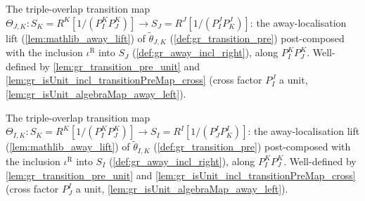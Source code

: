 \begin{definition}

  \label{def:gr_cocycle_theta_jk}
  The triple-overlap transition map
  \(\Theta_{J,K} : S_K = R^K[1/(P^K_I P^K_J)] \to S_J = R^J[1/(P^J_I P^J_K)]\):
  the away-localisation lift (\cref{lem:mathlib_away_lift}) of
  \(\tilde\theta_{J,K}\) (\cref{def:gr_transition_pre}) post-composed with the
  inclusion \(\iota^{\mathrm{R}}\) into \(S_J\) (\cref{def:gr_away_incl_right}),
  along \(P^K_I P^K_J\). Well-defined by \cref{lem:gr_transition_pre_unit} and
  \cref{lem:gr_isUnit_incl_transitionPreMap_cross} (cross factor \(P^J_I\) a
  unit, \cref{lem:gr_isUnit_algebraMap_away_left}).
\end{definition}

\begin{definition}

  \label{def:gr_cocycle_theta_ik}
  The triple-overlap transition map
  \(\Theta_{I,K} : S_K = R^K[1/(P^K_I P^K_J)] \to S_I = R^I[1/(P^I_J P^I_K)]\):
  the away-localisation lift (\cref{lem:mathlib_away_lift}) of
  \(\tilde\theta_{I,K}\) (\cref{def:gr_transition_pre}) post-composed with the
  inclusion \(\iota^{\mathrm{R}}\) into \(S_I\) (\cref{def:gr_away_incl_right}),
  along \(P^K_I P^K_J\). Well-defined by \cref{lem:gr_transition_pre_unit} and
  \cref{lem:gr_isUnit_incl_transitionPreMap_cross} (cross factor \(P^I_J\) a
  unit, \cref{lem:gr_isUnit_algebraMap_away_left}).
\end{definition}


